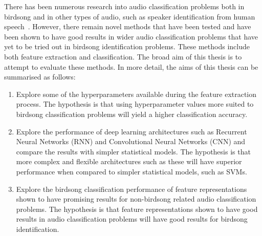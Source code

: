There has been numerous research into audio classification problems both in
birdsong and in other types of audio, such as speaker identification from human
speech~\cite{KUDO19991103}. However, there remain novel methods that have been
tested and have been shown to have good results in wider audio classification
problems that have yet to be tried out in birdsong identification problems.
These methods include both feature extraction and classification. The
broad aim of this thesis is to attempt to evaluate these methods. In more
detail, the aims of this thesis can be summarised as follows:

\begin{enumerate}

  \item Explore some of the hyperparameters available during the feature
    extraction process. The hypothesis is that using hyperparameter values more
    suited to birdsong classification problems will yield a higher classification
    accuracy.

  \item Explore the performance of deep learning architectures such as Recurrent
    Neural Networks (RNN) and Convolutional Neural Networks (CNN) and compare
    the results with simpler statistical models. The hypothesis is that more
    complex and flexible architectures such as these will have superior
    performance when compared to simpler statistical models, such as SVMs.

  \item Explore the birdsong classification performance of feature
    representations shown to have promising results for non-birdsong related
    audio classification problems. The hypothesis is that feature
    representations shown to have good results in audio classification problems
    will have good results for birdsong identification.

\end{enumerate}
